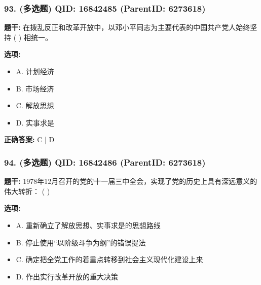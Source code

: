 \documentclass[12pt,UTF8]{ctexart}
\begin{document}
\vspace{0.3em}\hrulefill\vspace{0.7em}

\subsubsection*{93. (多选题) \small QID: 16842485 (ParentID: 6273618)}

\textbf{题干:}
在拨乱反正和改革开放中，以邓小平同志为主要代表的中国共产党人始终坚持 ( ) 相统一。



\textbf{选项:}
\begin{itemize}[leftmargin=*]

  \item A. 计划经济

  \item B. 市场经济

  \item C. 解放思想

  \item D. 实事求是

\end{itemize}

\textbf{正确答案:}
C | D

\vspace{0.3em}\hrulefill\vspace{0.7em}

\subsubsection*{94. (多选题) \small QID: 16842486 (ParentID: 6273618)}

\textbf{题干:}
1978年12月召开的党的十一届三中全会，实现了党的历史上具有深远意义的伟大转折： ( )



\textbf{选项:}
\begin{itemize}[leftmargin=*]

  \item A. 重新确立了解放思想、实事求是的思想路线

  \item B. 停止使用“以阶级斗争为纲”的错误提法

  \item C. 确定把全党工作的着重点转移到社会主义现代化建设上来

  \item D. 作出实行改革开放的重大决策

\end{itemize}
\end{document}
